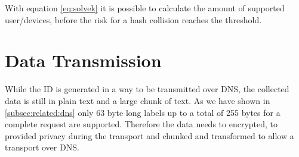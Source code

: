         With equation \ref{eq:solvek} it is possible to calculate the amount of supported user/devices, before the risk for a hash collision reaches the threshold.
\newpage



\section{Data Transmission}
\label{sec:software_design:tx}
%
    While the ID is generated in a way to be transmitted over DNS, the collected data is still in plain text and a large chunk of text. As we have shown in \ref{subsec:related:dns} only 63 byte long labels up to a total of 255 bytes for a complete request are supported.
    Therefore the data needs to encrypted, to provided privacy during the transport and chunked and transformed to allow a transport over DNS.\\
